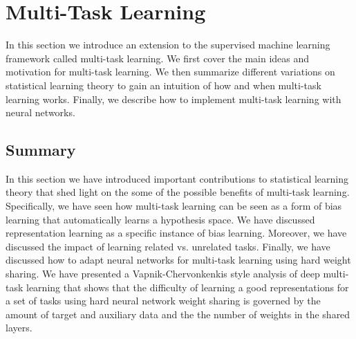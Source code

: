 \chapter{Multi-Task Learning}
\label{multi-task_learning}
In this section we introduce an extension to the supervised machine learning framework called multi-task learning. We first cover the main ideas and motivation for multi-task learning. We then summarize different variations on statistical learning theory to gain an intuition of how and when multi-task learning works. Finally, we describe how to implement multi-task learning with neural networks.







\section{Summary}
In this section we have introduced important contributions to statistical learning theory that shed light on the some of the possible benefits of multi-task learning. Specifically, we have seen how multi-task learning can be seen as a form of bias learning that automatically learns a hypothesis space. We have discussed representation learning as a specific instance of bias learning. Moreover, we have discussed the impact of learning related vs. unrelated tasks. Finally, we have discussed how to adapt neural networks for multi-task learning using hard weight sharing. We have presented a Vapnik-Chervonkenkis style analysis of deep multi-task learning that shows that the difficulty of learning a good representations for a set of tasks using hard neural network weight sharing is governed by the amount of target and auxiliary data and the the number of weights in the shared layers.